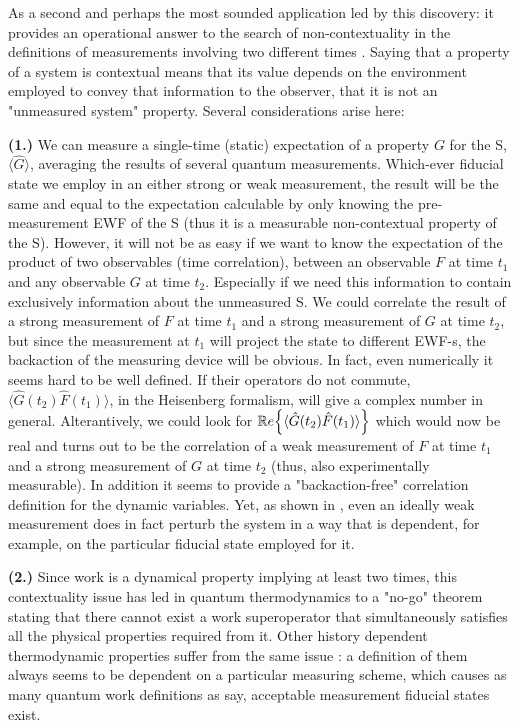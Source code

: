 \documentclass[11pt, a4paper]{article} %
\begin{document}
As a second and perhaps the most sounded application led by this discovery: it provides an operational answer to the search of non-contextuality in the definitions of measurements involving two different times \cite{DevInPosition1}. Saying that a property of a system is contextual means that its value depends on the environment employed to convey that information to the observer, that it is not an "unmeasured system" property. Several considerations arise here:

{\bf (1.)} We can measure a single-time (static) expectation of a property $G$ for the S, $\langle \hat{G}\rangle$, averaging the results of several quantum measurements. Which-ever fiducial state we employ in an either strong or weak measurement, the result will be the same and equal to the expectation calculable by only knowing the pre-measurement EWF of the S (thus it is a measurable non-contextual property of the S). However, it will not be as easy if we want to know the expectation of the product of two observables (time correlation), between an observable $F$ at time $t_1$ and any observable $G$ at time $t_2$. Especially if we need this information to contain exclusively information about the unmeasured S. We could correlate the result of a strong measurement of $F$ at time $t_1$ and a strong measurement of $G$ at time $t_2$, but since the measurement at $t_1$ will project the state to different EWF-s, the backaction of the measuring device will be obvious. In fact, even numerically it seems hard to be well defined. If their operators do not commute, $\langle \hat{G}(t_2)\hat{F}(t_1)\rangle$, in the Heisenberg formalism, will give a complex number in general. Alterantively, we could look for $\mathbb{R}e \qty{\langle \hat{G}(t_2)\hat{F}(t_1)\rangle}$ which would now be real and turns out to be the correlation of a weak measurement of $F$ at time $t_1$ and a strong measurement of $G$ at time $t_2$ (thus, also experimentally measurable). In addition it seems to provide a "backaction-free" correlation definition for the dynamic variables. Yet, as shown in \cite{spin}, even an ideally weak measurement does in fact perturb the system in a way that is dependent, for example, on the particular fiducial state employed for it.

{\bf (2.)} Since work is a dynamical property implying at least two times, this contextuality issue has led in quantum thermodynamics to a "no-go" theorem \cite{nogo} stating that there cannot exist a work superoperator that simultaneously satisfies all the physical properties required from it. Other history dependent thermodynamic properties suffer from the same issue \cite{workPb1, workPb2}: a definition of them always seems to be dependent on a particular measuring scheme, which causes as many quantum work definitions as say, acceptable measurement fiducial states exist.
\end{document}
